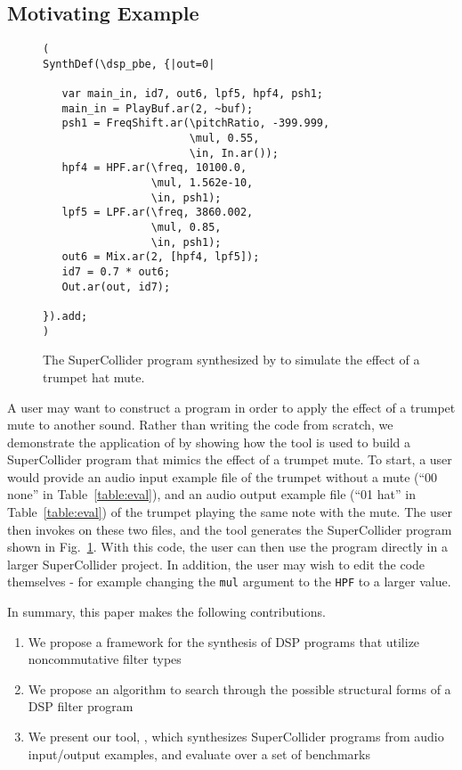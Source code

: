 \subsection{Motivating Example}


\begin{figure}
\begin{lstlisting}
( 
SynthDef(\dsp_pbe, {|out=0|

   var main_in, id7, out6, lpf5, hpf4, psh1;
   main_in = PlayBuf.ar(2, ~buf);
   psh1 = FreqShift.ar(\pitchRatio, -399.999, 
                       \mul, 0.55, 
                       \in, In.ar());
   hpf4 = HPF.ar(\freq, 10100.0, 
                 \mul, 1.562e-10, 
                 \in, psh1);
   lpf5 = LPF.ar(\freq, 3860.002, 
                 \mul, 0.85, 
                 \in, psh1);
   out6 = Mix.ar(2, [hpf4, lpf5]);
   id7 = 0.7 * out6;
   Out.ar(out, id7);

}).add;
)
\end{lstlisting}
\caption{The SuperCollider program synthesized by \ourTool to simulate the effect of a trumpet hat mute.}
\label{fig:sc_code}
\end{figure}

A user may want to construct a program in order to apply the effect of a trumpet mute to another sound.
Rather than writing the code from scratch, we demonstrate the application of \ourTool by showing how the tool is used to build a SuperCollider program that mimics the effect of a trumpet mute.
To start, a user would provide an audio input example file of the trumpet without a mute (``00 none'' in Table~\ref{table:eval}), and an audio output example file (``01 hat'' in Table~\ref{table:eval}) of the trumpet playing the same note with the mute.
The user then invokes \ourTool on these two files, and the tool generates the SuperCollider program shown in Fig.~\ref{fig:sc_code}.
With this code, the user can then use the program directly in a larger SuperCollider project.
In addition, the user may wish to edit the code themselves - for example changing the \texttt{mul} argument to the \texttt{HPF} to a larger value.

In summary, this paper makes the following contributions.

\begin{enumerate}
\item We propose a framework for the synthesis of DSP programs that utilize noncommutative filter types 
\item We propose an algorithm to search through the possible structural forms of a DSP filter program
\item We present our tool, \ourTool, which synthesizes SuperCollider programs from audio input/output examples, and evaluate \ourTool over a set of benchmarks
\end{enumerate}


